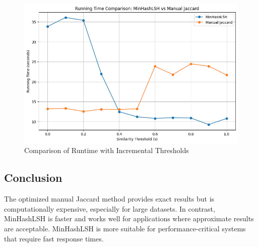 \begin{figure}
    \label{fig:figure}
    \centering
    \includegraphics[width=\linewidth]{sections/Comparison_Graph}
    \begin{center}
        \caption{Comparison of Runtime with Incremental Thresholds}
    \end{center}
\end{figure}

\subsection{Conclusion}
\label{subsec:conclusion}
The optimized manual Jaccard method provides exact results but is computationally expensive, especially for large datasets.
In contrast, MinHashLSH is faster and works well for applications where approximate results are acceptable.
MinHashLSH is more suitable for performance-critical systems that require fast response times.